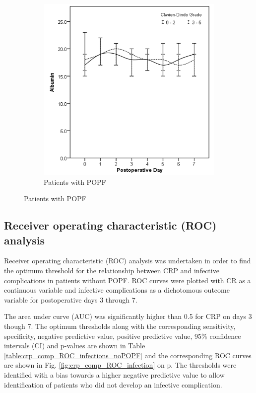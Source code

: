 \begin{figure}[t]
\begin{subfigure}{0.48\textwidth}
		\includegraphics[width=\textwidth]{Figures/crp_comp_Albumin_infective_leak1}
		\caption{Patients with POPF}
		\label{fig:crp_comp_Albumin_infective_leak1}
	\end{subfigure}
\end{figure}
\vfill

\clearpage

\subsection{Receiver operating characteristic (ROC) analysis}
Receiver operating characteristic (ROC) analysis was undertaken in order to find the optimum threshold for the relationship between CRP and infective complications in patients without POPF. 
ROC curves were plotted with CR as a continuous variable and infective complications as a dichotomous outcome variable for postoperative days 3 through 7. 

The area under curve (AUC) was significantly higher than 0.5 for CRP on days 3 though 7. 
The optimum thresholds along with the corresponding sensitivity, specificity, negative predictive value, positive predictive value, 95\% confidence intervals (CI) and p-values are shown in Table \ref{table:crp_comp_ROC_infections_noPOPF} and the corresponding ROC curves are shown in Fig. \ref{fig:crp_comp_ROC_infection} on p\pageref{fig:crp_comp_ROC_infection}. 
The thresholds were identified with a bias towards a higher negative predictive value to allow identification of patients who did not develop an infective complication. 

